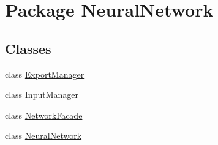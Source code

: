 \hypertarget{namespace_neural_network}{}\section{Package Neural\+Network}
\label{namespace_neural_network}
\subsection*{Classes}
\begin{DoxyCompactItemize}
\item 
class \hyperlink{class_neural_network_1_1_export_manager}{Export\+Manager}
\item 
class \hyperlink{class_neural_network_1_1_input_manager}{Input\+Manager}
\item 
class \hyperlink{class_neural_network_1_1_network_facade}{Network\+Facade}
\item 
class \hyperlink{class_neural_network_1_1_neural_network}{Neural\+Network}
\end{DoxyCompactItemize}
